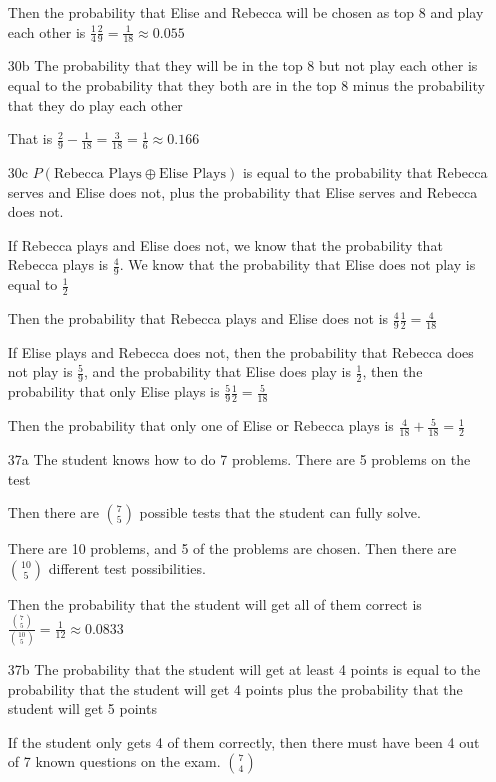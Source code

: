 \documentclass[11pt]{article}
\begin{document}
\begin{itemize}
  Then the probability that Elise and Rebecca will be chosen as top 8 and play each other is $\frac{1}{4}\frac{2}{9} = \frac{1}{18} \approx 0.055$
\item[30b]
  The probability that they will be in the top 8 but not play each other is equal to the probability that they both are in the top 8 minus the probability that they do play each other

  That is $\frac{2}{9} - \frac{1}{18} = \frac{3}{18} = \frac{1}{6} \approx 0.166$
\item[30c]
  $P(\text{Rebecca Plays}\oplus\text{Elise Plays})$ is equal to the probability that Rebecca serves and Elise does not, plus the probability that Elise serves and Rebecca does not.

  If Rebecca plays and Elise does not, we know that the probability that Rebecca plays is $\frac{4}{9}$. We know that the probability that Elise does not play is equal to $\frac{1}{2}$

  Then the probability that Rebecca plays and Elise does not is $\frac{4}{9} \frac{1}{2} = \frac{4}{18}$

  If Elise plays and Rebecca does not, then the probability that Rebecca does not play is $\frac{5}{9}$, and the probability that Elise does play is $\frac{1}{2}$, then the probability that only Elise plays is $\frac{5}{9} \frac{1}{2} = \frac{5}{18}$

  Then the probability that only one of Elise or Rebecca plays is $\frac{4}{18} + \frac{5}{18} = \frac{1}{2}$

\item[37a]
  The student knows how to do 7 problems. There are 5 problems on the test

  Then there are $\binom{7}{5}$ possible tests that the student can fully solve.

  There are 10 problems, and 5 of the problems are chosen. Then there are $\binom{10}{5}$ different test possibilities.

  Then the probability that the student will get all of them correct is $\frac{\binom{7}{5}}{\binom{10}{5}} = \frac{1}{12} \approx 0.0833$
\item[37b]
  The probability that the student will get at least 4 points is equal to the probability that the student will get 4 points plus the probability that the student will get 5 points

  If the student only gets 4 of them correctly, then there must have been 4 out of 7 known questions on the exam. $\binom{7}{4}$


\end{itemize}
\end{document}
